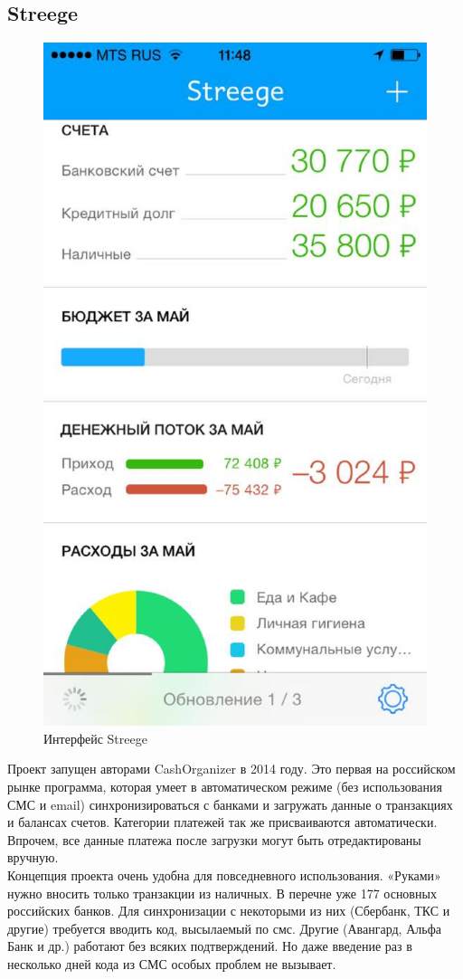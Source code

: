 \subsection{Streege}
\begin{figure}[H]
	\centering
	\includegraphics[width=0.7\linewidth]{pics/Streege.eps}
	\caption{Интерфейс Streege}
	\label{fig:Streege}
\end{figure}
Проект запущен авторами CashOrganizer в 2014 году. Это первая на российском рынке программа, которая умеет в автоматическом режиме (без использования СМС и email) синхронизироваться с банками и загружать данные о транзакциях и балансах счетов. Категории платежей так же присваиваются автоматически. Впрочем, все данные платежа после загрузки могут быть отредактированы вручную.\\

Концепция проекта очень удобна для повседневного использования. «Руками» нужно вносить только транзакции из наличных. В перечне уже 177 основных российских банков. Для синхронизации с некоторыми из них (Сбербанк, ТКС и другие) требуется вводить код, высылаемый по смс. Другие (Авангард, Альфа Банк и др.) работают без всяких подтверждений. Но даже введение раз в несколько дней кода из СМС особых проблем не вызывает.\\

